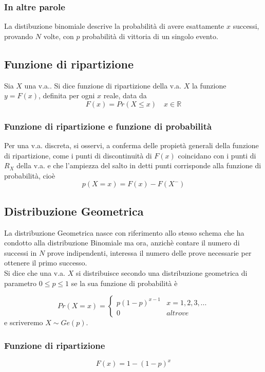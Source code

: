 \documentclass[12pt]{report}
\begin{document}
   \subsubsection{In altre parole}
   La distibuzione binomiale descrive la probabilità di avere esattamente $x$ successi, provando $N$ volte, con $p$ probabilità di vittoria di un singolo evento.

   \subsection{Funzione di ripartizione}
   Sia $X$ una v.a.. Si dice funzione di ripartizione della v.a. $X$ la funzione $y=F(x)$, definita per ogni $x$ reale, data da
   \[ F(x) = Pr(X \leq x) \quad x \in \mathbb{R} \]

  \subsubsection{Funzione di ripartizione e funzione di probabilità}
  Per una v.a. discreta, si osservi, a conferma delle propietà generali della funzione di ripartizione, come i punti di discontinuità di $F(x)$ coincidano con i punti di $R_X$ della v.a. e che l'ampiezza del salto in detti punti corrisponde alla funzione di probabilità, cioè
  \[ p(X=x) = F(x) - F(X^-) \]

  \subsection{Distribuzione Geometrica}
  La distribuzione Geometrica nasce con riferimento allo stesso schema che ha condotto alla distribuzione Binomiale ma ora, anzichè contare il numero di successi in $N$ prove indipendenti, interessa il numero delle prove necessarie per ottenere il primo successo.\\

  Si dice che una v.a. $X$ si distribuisce secondo una distribuzione geometrica di parametro $0 \leq p \leq 1$ se la sua funzione di probabilità è

  \[
    Pr(X=x)=
      \begin{cases}
        p(1-p)^{x-1} & x = 1,2,3,... \\
        0 & altrove
      \end{cases}
  \]
  e scriveremo $X \sim Ge(p)$.
  \subsubsection{Funzione di ripartizione}
  \[ F(x) =   1-(1-p)^x \]
\end{document}
